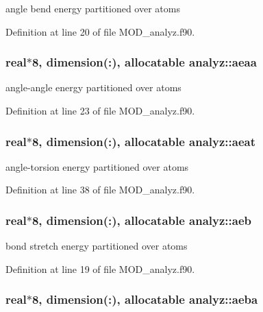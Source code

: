 angle bend energy partitioned over atoms 



Definition at line 20 of file M\-O\-D\-\_\-analyz.\-f90.

\hypertarget{classanalyz_a5765b45f639e73a203564e3a4f354071}{
\subsubsection[{aeaa}]{\setlength{\rightskip}{0pt plus 5cm}real$\ast$8, dimension(\-:), allocatable analyz\-::aeaa}}\label{classanalyz_a5765b45f639e73a203564e3a4f354071}


angle-\/angle energy partitioned over atoms 



Definition at line 23 of file M\-O\-D\-\_\-analyz.\-f90.

\hypertarget{classanalyz_a9ccc7ede29328932abc2ddb2c6b22b0d}{
\subsubsection[{aeat}]{\setlength{\rightskip}{0pt plus 5cm}real$\ast$8, dimension(\-:), allocatable analyz\-::aeat}}\label{classanalyz_a9ccc7ede29328932abc2ddb2c6b22b0d}


angle-\/torsion energy partitioned over atoms 



Definition at line 38 of file M\-O\-D\-\_\-analyz.\-f90.

\hypertarget{classanalyz_a73f838c7494055151eeb31399db8561b}{
\subsubsection[{aeb}]{\setlength{\rightskip}{0pt plus 5cm}real$\ast$8, dimension(\-:), allocatable analyz\-::aeb}}\label{classanalyz_a73f838c7494055151eeb31399db8561b}


bond stretch energy partitioned over atoms 



Definition at line 19 of file M\-O\-D\-\_\-analyz.\-f90.

\hypertarget{classanalyz_ae422b72bdca95decd1938af39d9d63f4}{
\subsubsection[{aeba}]{\setlength{\rightskip}{0pt plus 5cm}real$\ast$8, dimension(\-:), allocatable analyz\-::aeba}}\label{classanalyz_ae422b72bdca95decd1938af39d9d63f4}


